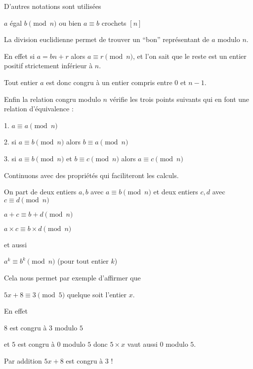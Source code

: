 \change

D'autres notations sont utilisées

$a$ égal $b \pmod n$ \quad  ou bien  \quad  $a \equiv b$ crochets $[n]$

\change 

La division euclidienne permet de trouver un ``bon'' représentant 
de $a$ modulo $n$.

En effet si $a=bn+r$ alors $a\equiv r \pmod n$,
et l'on sait que le reste est un entier positif strictement inférieur à $n$.

Tout entier $a$ est donc congru à un entier compris entre $0$ et $n-1$.

\change

Enfin la relation congru modulo $n$ vérifie les trois points suivants qui en font une relation d'équivalence :

\change

1. $a \equiv a \pmod n$

\change

2. si $a \equiv b \pmod n$ alors $b \equiv a \pmod n$

\change

3. si $a \equiv b \pmod n$ et $b \equiv c \pmod n$ alors $a \equiv c \pmod n$


\diapo

Continuons avec des propriétés qui faciliteront les calculs.


On part de deux entiers $a,b$ avec  $a \equiv b \pmod n$ et 
deux entiers $c,d$ avec $c \equiv d \pmod n$


\change

 $a+c \equiv b+d \pmod n$

\change

 $a\times c \equiv b \times d \pmod n$

\change

et aussi 

 $a^k \equiv b^k \pmod n$ (pour tout entier $k$)

\change

Cela nous permet par exemple d'affirmer que 

$5x+8 \equiv 3 \pmod 5$ \quad quelque soit l'entier $x$.

En effet 

$8$ est congru à $3$ modulo $5$

et $5$ est congru à $0$ modulo $5$
donc $5 \times x$ vaut aussi $0$ modulo $5$.

Par addition $5x+8$ est congru à $3$ !


